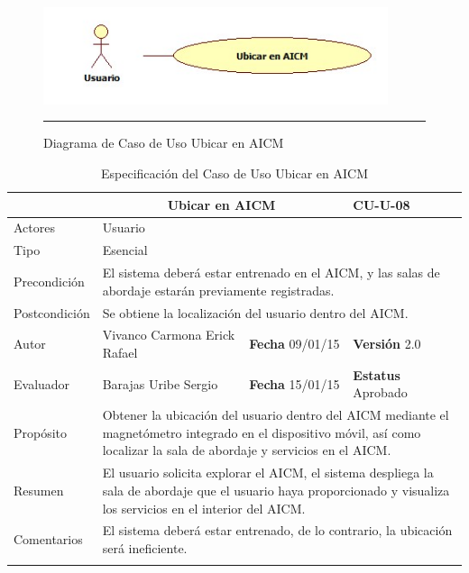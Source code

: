 \begin{figure}[htbp]
	\centering
		\includegraphics[width=0.9\textwidth]{Figuras/cuUbicarAICM.jpg}
		\rule{30em}{0.5pt}
	\caption[Diagrama de Caso de Uso Ubicar en AICM]{Diagrama de Caso de Uso Ubicar en AICM}
	\label{fig:cuUbicarAICM}
\end{figure}
\newpage
\begin{longtable}{|p{2.5cm}|p{6.4cm}|p{2cm}|p{2cm}|}
	\hline
		\rowcolor[RGB]{51,153,255}{Caso de Uso}&\multicolumn{2}{c}{Ubicar en AICM}&{\textbf{CU-U-08}}\\
	\hline
		{Actores}&\multicolumn{3}{p{11.2cm}|}{Usuario}\\
	\hline
		{Tipo}&\multicolumn{3}{p{11.2cm}|}{Esencial}\\
	\hline
		{Precondición}&\multicolumn{3}{p{11.2cm}|}{El sistema deberá estar entrenado en el AICM, y las salas de abordaje estarán previamente registradas.}\\
	\hline
		{Postcondición}&\multicolumn{3}{p{11.2cm}|}{Se obtiene la localización del usuario dentro del AICM.}\\
	\hline
		{Autor}&{Vivanco Carmona Erick Rafael}&{\textbf{Fecha} 09/01/15}&{\textbf{Versión} 2.0}\\
			\hline
		{Evaluador}&{Barajas Uribe Sergio}&{\textbf{Fecha} 15/01/15}&{\textbf{Estatus} Aprobado}\\
	\hline
		{Propósito}&\multicolumn{3}{p{11.2cm}|}{Obtener la ubicación del usuario dentro del AICM mediante el magnetómetro integrado en el dispositivo móvil, así como localizar la sala de abordaje y servicios en el AICM. }\\
	\hline
		{Resumen}&\multicolumn{3}{p{11.2cm}|}{El usuario solicita explorar el AICM, el sistema despliega la sala de abordaje que el usuario haya proporcionado y visualiza los servicios en el interior del AICM.}\\	
	\hline
		{Comentarios}&\multicolumn{3}{p{11.2cm}|}{El sistema deberá estar entrenado, de lo contrario, la ubicación será ineficiente.}\\
	\hline
	\caption[Especificación del Caso de Uso Ubicar en AICM]{Especificación del Caso de Uso Ubicar en AICM}
    	\label{tab:cuUbicarAICM}
\end{longtable}

